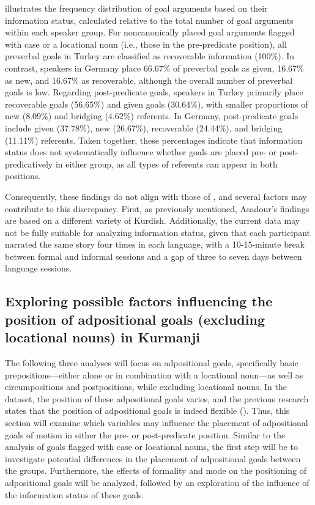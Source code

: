  illustrates the frequency distribution of goal arguments based on their information status, calculated relative to the total number of goal arguments within each speaker group. For noncanonically placed goal arguments flagged with case or a locational noun (i.e., those in the pre-predicate position), all preverbal goals in Turkey are classified as recoverable information (100\%). In contrast, speakers in Germany place 66.67\% of preverbal goals as given, 16.67\% as new, and 16.67\% as recoverable, although the overall number of preverbal goals is low. Regarding post-predicate goals, speakers in Turkey primarily place recoverable goals (56.65\%) and given goals (30.64\%), with smaller proportions of new (8.09\%) and bridging (4.62\%) referents. In Germany, post-predicate goals include given (37.78\%), new (26.67\%), recoverable (24.44\%), and bridging (11.11\%) referents. Taken together, these percentages indicate that information status does not systematically influence whether goals are placed pre- or post-predicatively in either group, as all types of referents can appear in both positions.

Consequently, these findings do not align with those of \citet{Asadpour2021}, and several factors may contribute to this discrepancy. First, as previously mentioned, Asadour's findings are based on a different variety of Kurdish. Additionally, the current data may not be fully suitable for analyzing information status, given that each participant narrated the same story four times in each language, with a 10-15-minute break between formal and informal sessions and a gap of three to seven days between language sessions.

\subsection{Exploring possible factors influencing the position of adpositional goals (excluding locational nouns) in Kurmanji}\label{sec:key:6.3.3}

The following three analyses will focus on adpositional goals, specifically basic prepositions—either alone or in combination with a locational noun—as well as circumpositions and postpositions, while excluding locational nouns. In the dataset, the position of these adpositional goals varies, and the previous research states that the position of adpositional goals is indeed flexible (\citealt{Haig2014, Haig2018}). Thus, this section will examine which variables may influence the placement of adpositional goals of motion in either the pre- or post-predicate position. Similar to the analysis of goals flagged with case or locational nouns, the first step will be to investigate potential differences in the placement of adpositional goals between the groups. Furthermore, the effects of formality and mode on the positioning of adpositional goals will be analyzed, followed by an exploration of the influence of the information status of these goals.

